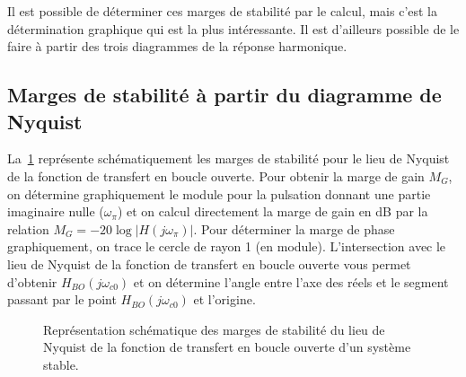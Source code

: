 Il est possible de déterminer ces marges de stabilité par le calcul, mais 
c'est la détermination graphique qui est la plus intéressante. Il est d'ailleurs
possible de le faire à partir des trois diagrammes de la réponse harmonique. 
\subsection{Marges de stabilité à partir du diagramme de Nyquist}
La~\cref{fig-nyquist_marges} représente schématiquement les marges 
de stabilité pour le lieu de Nyquist de la fonction de transfert en boucle
ouverte. Pour obtenir la marge de gain $M_G$, on
détermine graphiquement le module pour la pulsation donnant une 
partie imaginaire nulle ($\omega_\pi$) et on calcul directement la marge de gain
en dB par la relation $M_G=-20\log{|H(j\omega_\pi)|}$.
Pour déterminer la marge de phase graphiquement, on trace le cercle de rayon 1 
(en module). L'intersection avec le lieu de Nyquist de la fonction de transfert 
en boucle ouverte vous permet d'obtenir $H_{BO}(j\omega_{c0})$
et on détermine l'angle entre l'axe des réels et le segment passant par le point
$H_{BO}(j\omega_{c0})$ et l'origine.
\begin{figure}[!h]
    \centering
    
    \caption{Représentation schématique des marges de stabilité du lieu de 
             Nyquist de la fonction de transfert en boucle ouverte d'un système
             stable. \label{fig-nyquist_marges}}
\end{figure}
